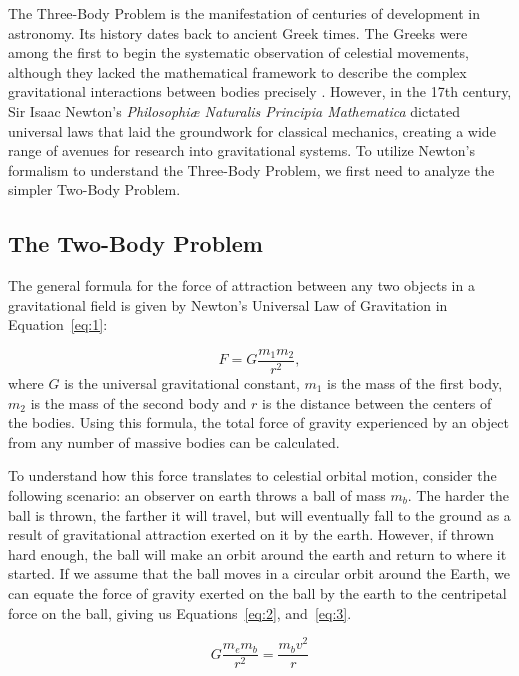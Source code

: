 \documentclass[12pt]{article}
\begin{document}
The Three-Body Problem is the manifestation of centuries
of development in astronomy. Its history dates back to ancient
Greek times. The Greeks were among the first to begin the
systematic observation of celestial movements, although they
lacked the mathematical framework to describe the complex
gravitational interactions between bodies precisely \citep{anjum2020timelinegravity}. However, in the 17th century, Sir Isaac Newton's
\textit{Philosophiæ Naturalis Principia Mathematica} \citep{newton1687principia, cohen1999principia} dictated universal laws that laid
the groundwork for classical mechanics, creating a wide range
of avenues for research into gravitational systems. To utilize
Newton's formalism to understand the Three-Body Problem,
we first need to analyze the simpler Two-Body Problem.

\subsection{The Two-Body Problem}
\label{subsec:2bp}
The general formula for the force of attraction between any two objects in a gravitational field is given by Newton's Universal Law of Gravitation in Equation~\ref{eq:1}:

\begin{equation}
    F=G\frac{m_1m_2}{r^2},
    \label{eq:1}
\end{equation}
where $G$ is the universal gravitational constant, $m_1$ is the mass of the first body, $m_2$ is the mass of the second body and $r$ is the distance between the centers of the bodies. Using this formula, the total force of gravity experienced by an object from any number of massive bodies can be calculated.

To understand how this force translates to celestial orbital motion, consider the following scenario: an observer on earth throws a ball of mass $m_b$. The harder the ball is thrown, the farther it will travel, but will eventually fall to the ground as a result of gravitational attraction exerted on it by the earth. However, if thrown hard enough, the ball will make an orbit around the earth and return to where it started. If we assume that the ball moves in a circular orbit around the Earth, we can equate the force of gravity exerted on the ball by the earth to the centripetal force on the ball, giving us Equations~\ref{eq:2}, and~\ref{eq:3}.

\begin{equation}
    G\frac{m_e m_b}{r^2} = \frac{m_b v^2}{r}
    \label{eq:2}
\end{equation}
\end{document}
